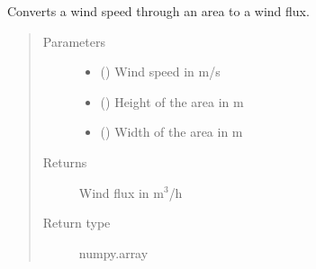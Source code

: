 \documentclass[letterpaper,10pt,english]{sphinxmanual}
\begin{document}
\begin{fulllineitems}
\label{\detokenize{air:livestock.air.wind_speed_to_flux}}
Converts a wind speed through an area to a wind flux.
\begin{quote}\begin{description}
\item[{Parameters}] \leavevmode\begin{itemize}
\item {} 
 () \textendash{} Wind speed in m/s

\item {} 
 () \textendash{} Height of the area in m

\item {} 
 () \textendash{} Width of the area in m

\end{itemize}

\item[{Returns}] \leavevmode
Wind flux in m$^{\text{3}}$/h

\item[{Return type}] \leavevmode
numpy.array

\end{description}\end{quote}

\end{fulllineitems}

\end{document}

